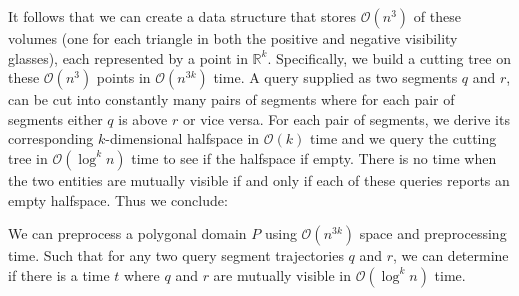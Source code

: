 \documentclass[UKenglish]{lipics-v2019}
\begin{document}
It follows that we can create a data structure that stores $\mathcal{O}(n^3)$ of these volumes (one for each triangle in both the positive and negative visibility glasses), each represented by a point in $\mathbb{R}^k$. Specifically, we build a cutting tree on these $\mathcal{O}(n^3)$ points in $\mathcal{O}(n^{3k})$ time. A query supplied as two segments $q$ and $r$, can be cut into constantly many pairs of segments where for each pair of segments either $q$ is above $r$ or vice versa. For each pair of segments, we derive its corresponding $k$-dimensional halfspace in $\mathcal{O}(k)$ time and we query the cutting tree in $\mathcal{O}(\log^k n)$ time to see if the halfspace if empty. There is no time when the two entities are mutually visible if and only if each of these queries reports an empty halfspace. Thus we conclude:

\begin{theorem}
    We can preprocess a polygonal domain $P$ using $\mathcal{O}(n^{3k})$  space and preprocessing time. Such that for any two query segment trajectories $q$ and $r$, we can determine if there is a time $t$ where $q$ and $r$ are mutually visible in $\mathcal{O}(\log^k n)$ time.
\end{theorem}
\end{document}
